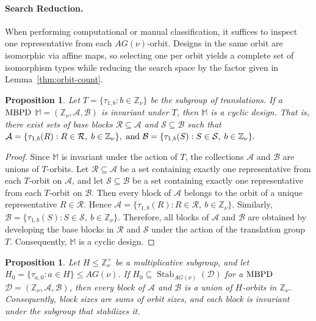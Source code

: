 \documentclass[preprint,11pt]{elsarticle}
\newcommand{\MBPD}{\textnormal{MBPD}}
\newtheorem{proposition}[theorem]{Proposition}
\begin{document}
\paragraph{Search Reduction.}
When performing computational or manual classification, it suffices to inspect one representative from each $AG(\nu)$-orbit.  
Designs in the same orbit are isomorphic via affine maps, so selecting one per orbit yields a complete set of isomorphism types while reducing the search space by the factor given in Lemma~\ref{thm:orbit-count}.

\begin{proposition}
\label{prop:translation-regular}
Let $T=\{\tau_{1,b}:b\in\mathbb Z_\nu\}$ be the subgroup of translations.  
If a $\MBPD$ $\mathbb M=(\mathbb Z_\nu,\mathcal A,\mathcal B)$ is invariant under $T$, then $\mathbb M$ is a cyclic design.  
That is, there exist sets of base blocks $\mathcal R\subseteq\mathcal A$ and $\mathcal S\subseteq\mathcal B$ such that
\(
\mathcal A=\{\tau_{1,b}(R): R\in\mathcal R, \; b\in\mathbb Z_\nu\}, \textnormal{~and~}
\mathcal B=\{\tau_{1,b}(S): S\in\mathcal S, \; b\in\mathbb Z_\nu\}.
\)
\end{proposition}
\begin{proof}
Since $\mathbb M$ is invariant under the action of $T$, the collections $\mathcal A$ and $\mathcal B$ are unions of $T$-orbits. Let $\mathcal R\subseteq\mathcal A$ be a set containing exactly one representative from each $T$-orbit on $\mathcal A$, and let $\mathcal S\subseteq\mathcal B$ be a set containing exactly one representative from each $T$-orbit on $\mathcal B$.
Then every block of $\mathcal A$ belongs to the orbit of a unique representative $R\in\mathcal R$. Hence
\(
\mathcal A
=
\{\tau_{1,b}(R): R\in\mathcal R,\ b\in\mathbb Z_\nu\}.
\)
Similarly,
\(
\mathcal B
=
\{\tau_{1,b}(S): S\in\mathcal S,\ b\in\mathbb Z_\nu\}.
\)
Therefore, all blocks of $\mathcal A$ and $\mathcal B$ are obtained by developing the base blocks in $\mathcal R$ and $\mathcal S$ under the action of the translation group $T$. Consequently, $\mathbb M$ is a cyclic design.
\end{proof}



\begin{proposition}
\label{prop:mult-invariance}
Let $H\le\mathbb Z_\nu^\times$ be a multiplicative subgroup, and let  
$H_0=\{\tau_{a,0}: a\in H\}\le AG(\nu)$.  
If $H_0\subseteq\operatorname{Stab}_{AG(\nu)}(\mathcal D)$ for a $\MBPD$ $\mathcal D=(\mathbb Z_\nu,\mathcal A,\mathcal B)$, then every block of $\mathcal A$ and $\mathcal B$ is a union of $H$-orbits in $\mathbb Z_\nu$.  
Consequently, block sizes are sums of orbit sizes, and each block is invariant under the subgroup that stabilizes it.
\end{proposition}
\end{document}
